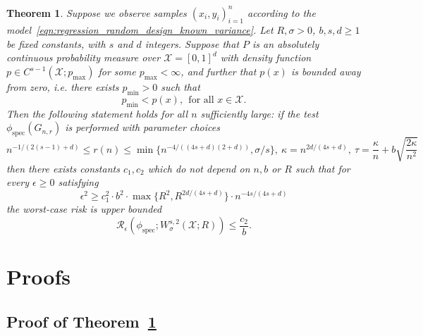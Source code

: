 \documentclass{article}
\newcommand{\1}{\mathbf{1}}
\newcommand{\Xset}{\mathcal{X}}
\newcommand{\spec}{\mathrm{spec}}
\theoremstyle{alden}
\theoremstyle{aldenthm}
\newtheorem{theorem}{Theorem}
\theoremstyle{definition}
\theoremstyle{remark}
\begin{document}
\begin{theorem}
	\label{thm:sobolev_testing_rate}
	Suppose we observe samples $(x_i,y_i)_{i = 1}^{n}$ according to the model~\eqref{eqn:regression_random_design_known_variance}. Let $R,\sigma > 0$, $b,s,d \geq 1$ be fixed constants, with $s$ and $d$ integers. Suppose that $P$ is an absolutely continuous probability measure over $\mathcal{X} = [0,1]^d$ with density function $p \in C^{s-1}(\Xset;p_{\max})$ for some $p_{\max} < \infty$, and further that $p(x)$ is bounded away from zero, i.e. there exists $p_{\min} > 0$ such that 
	\begin{equation*}
	p_{\min} < p(x),~~ \textrm{for all $x \in \mathcal{X}$.}
	\end{equation*}
	Then the following statement holds for all $n$ sufficiently large: if the test $\phi_{\spec}(G_{n,r})$ is performed with parameter choices
	\begin{equation*}
	n^{-1/(2(s-1) + d)} \leq r(n) \leq \min\bigl\{n^{-4/((4s + d)(2+d))},\sigma/s\bigr\}, ~\kappa = n^{2d/(4s + d)}, ~\tau = \frac{\kappa}{n} + b\sqrt{\frac{2\kappa}{n^2}}
	\end{equation*}
	then there exists constants $c_1,c_2$ which do not depend on $n,b$ or $R$ such that for every $\epsilon \geq 0$ satisfying
	\begin{equation}
	\label{eqn:sobolev_testing_rate}
	\epsilon^2 \geq c_1^2 \cdot b^2 \cdot \max\{R^2,R^{2d/(4s + d)}\} \cdot n^{-{4s}/(4s + d)}
	\end{equation}
	the worst-case risk is upper bounded
	\begin{equation}
	\label{eqn:sobolev_testing_rate_1}
	\mathcal{R}_{\epsilon}(\phi_{\mathrm{spec}}; W_{\sigma}^{s,2}(\mathcal{X};R)) \leq \frac{c_2}{b}.
	\end{equation}
\end{theorem}

\section{Proofs}

\subsection{Proof of Theorem~\ref{thm:sobolev_testing_rate}}
\end{document}

